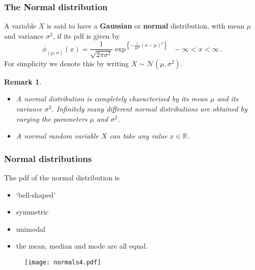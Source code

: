 \documentclass[notes=show,smaller,handout]{beamer}\usepackage[]{graphicx}\usepackage[]{color}
\newtheorem{remark}{Remark}[section]
\newcommand{\N}{\mathcal{N}}
\newenvironment{stepitemize}{\begin{itemize}[<+->]}{\end{itemize} }
\begin{document}
\begin{frame}%

\frametitle{The Normal distribution}

\begin{definition}
A variable $X$ is said to have a \textbf{Gaussian} or \textbf{normal}
distribution, with mean $\mu $ and variance $\sigma ^{2}$, if its pdf is given by
\begin{equation*}
\phi_{(\mu,\sigma)}(x) =\frac{1}{\sqrt{2\pi \sigma ^{2}}}\exp^{ \left\{ -\frac{1%
}{2\sigma ^{2}}\left( x-\mu \right) ^{2}\right\}}~~-\infty<x<\infty\,.
\end{equation*}
For simplicity we denote this by writing $X\sim \N\left( \mu ,\sigma ^{2}\right) $.
\end{definition}

\begin{remark}
\begin{stepitemize}
\item A normal distribution is completely characterised by its mean $\mu $ and its variance $\sigma ^{2}$. Infinitely many different normal distributions are obtained by varying the parameters $\mu $ and $\sigma ^{2}$.
\item A normal random variable $X$ can take any value $x\in\mathbb{R}$.
\end{stepitemize}
\end{remark}

\end{frame}%

\begin{frame}%

\frametitle{Normal distributions}

The pdf of the normal distribution is
\begin{stepitemize}
\item `bell-shaped'
\item symmetric
\item unimodal
\item the mean, median and mode are all equal.
\end{stepitemize}
\begin{figure}[ptb]\centering
\texttt{[image: normals4.pdf]}%
\end{figure}%
\end{frame}%
\end{document}

